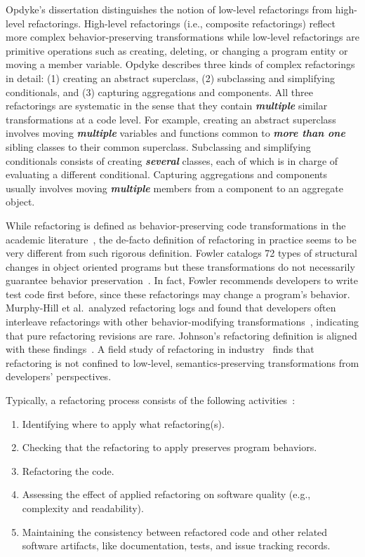 \documentclass[runningheads,a4paper]{llncs}
\begin{document}
Opdyke's dissertation \cite{Opdyke1992:ROF} distinguishes the notion of low-level refactorings from high-level refactorings. High-level refactorings (i.e., composite refactorings) reflect more complex behavior-preserving transformations while low-level refactorings are primitive operations such as creating, deleting, or changing a program entity or moving a member variable. Opdyke describes three kinds of complex refactorings in detail: (1) creating an abstract superclass, (2) subclassing and simplifying conditionals, and (3) capturing aggregations and components. All three refactorings are systematic in the sense that they contain {\bf \em multiple} similar transformations at a code level. For example, {creating an abstract superclass} involves moving {\bf \em multiple} variables and functions common to {\bf \em more than one} sibling classes to their common superclass.  {Subclassing and simplifying conditionals} consists of creating {\bf \em several} classes, each of which is in charge of evaluating a different conditional.  {Capturing aggregations and components} usually involves moving {\bf \em multiple} members from a component to an aggregate object. 

While refactoring is defined as behavior-preserving code transformations in the academic literature~\cite{Mens2004:SSR}, the de-facto definition of refactoring in practice seems to be very different from such rigorous definition. Fowler catalogs 72 types of structural changes in object oriented programs but these transformations do not necessarily guarantee behavior preservation~\cite{1999:RID}. In fact, Fowler recommends developers to write test code first before, since these refactorings may change a program's behavior. Murphy-Hill et al.~analyzed refactoring logs and found that developers often interleave refactorings with other behavior-modifying transformations~\cite{Murphy-Hill2012:refactor}, indicating that pure refactoring revisions are rare. Johnson's refactoring definition is aligned with these findings~\cite{Johnson2011}. A field study of refactoring in industry~\cite{Kim2014:EmpiricalStudy,Kim2012:FSR} finds that refactoring is not confined to low-level, semantics-preserving transformations from developers' perspectives.    



Typically, a refactoring process consists of the following activities~\cite{Mens2004:SSR}:
\begin{enumerate}
\item Identifying where to apply what refactoring(s).
\item Checking that the refactoring to apply preserves program behaviors.
\item Refactoring the code.
\item Assessing the effect of applied refactoring on software quality (e.g., complexity and readability). 
\item Maintaining the consistency between refactored code and other related software artifacts, like documentation, tests, and issue tracking records.  
\end{enumerate}
\end{document}
